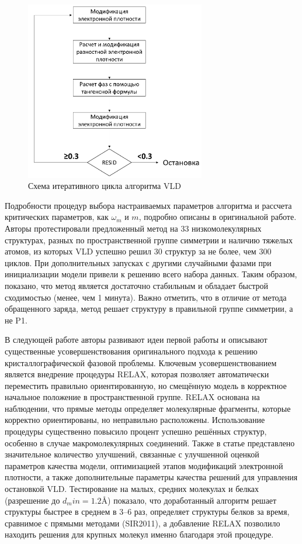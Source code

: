 \begin{figure}[H]
	\centering
	\includegraphics[width=0.7\textwidth]{figures/vld.png}\hfill
	\caption{Схема итеративного цикла алгоритма VLD}
	\label{vld}
\end{figure}

Подробности процедур выбора настраиваемых параметров алгоритма и рассчета критических параметров, как $\omega_m$ и $m$, подробно описаны в оригинальной работе. Авторы протестировали предложенный метод на 33 низкомолекулярных структурах, разных по пространственной группе симметрии и наличию тяжелых атомов, из которых VLD успешно решил 30 структур за не более, чем 300 циклов. При дополнительных запусках с другими случайными фазами при инициализации модели привели к решению всего набора данных. Таким образом, показано, что метод является достаточно стабильным и обладает быстрой сходимостью (менее, чем 1 минута). Важно отметить, что в отличие от метода обращенного заряда, метод решает структуру в правильной группе симметрии, а не P1.

В следующей работе \cite{burla_advances_2011} авторы развивают идеи первой работы и описывают существенные усовершенствования оригинального подхода к решению кристаллографической фазовой проблемы. Ключевым усовершенствованием является внедрение процедуры RELAX, которая позволяет автоматически переместить правильно ориентированную, но смещённую модель в корректное начальное положение в пространственной группе. RELAX основана на наблюдении, что прямые методы определяет молекулярные фрагменты, которые корректно ориентированы, но неправильно расположены. Использование процедуры существенно повысило процент успешно решённых структур, особенно в случае макромолекулярных соединений. Также в статье представлено значительное количество улучшений, связанные с улучшенной оценкой параметров качества модели, оптимизацией этапов модификаций электронной плотности, а также дополнительные параметры качества решений для управления остановкой VLD. Тестирование на малых, средних молекулах и белках (разрешение до $d_min = 1.2 \text{\AA}$) показало, что доработанный алгоритм решает структуры быстрее в среднем в 3--6 раз, определяет структуры белков за время, сравнимое с прямыми методами (SIR2011), а добавление RELAX позволило находить решения для крупных молекул именно благодаря этой процедуре.

